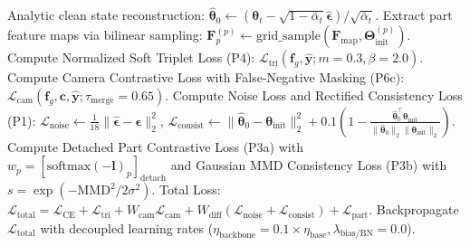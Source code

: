 \begin{algorithm}[ht]
\begin{algorithmic}[1]
        \State Analytic clean state reconstruction: $\hat{\boldsymbol{\theta}}_0 \leftarrow (\boldsymbol{\theta}_t - \sqrt{1 - \bar{\alpha}_t}\hat{\boldsymbol{\epsilon}}) / \sqrt{\bar{\alpha}_t}$.
        \State Extract part feature maps via bilinear sampling: $\mathbf{F}_p^{(p)} \leftarrow \text{grid\_sample}(\mathbf{F}_{\text{map}}, \mathbf{\Theta}_{\text{init}}^{(p)})$.
        \State Compute Normalized Soft Triplet Loss (P4): $\mathcal{L}_{\text{tri}}(\mathbf{f}_g, \hat{\mathbf{y}}; m=0.3, \beta=2.0)$.
        \State Compute Camera Contrastive Loss with False-Negative Masking (P6c): $\mathcal{L}_{\text{cam}}(\mathbf{f}_g, \mathbf{c}, \hat{\mathbf{y}}; \tau_{\text{merge}}=0.65)$.
        \State Compute Noise Loss and Rectified Consistency Loss (P1):
               $\mathcal{L}_{\text{noise}} \leftarrow \frac{1}{18}\|\hat{\boldsymbol{\epsilon}} - \boldsymbol{\epsilon}\|_2^2$, $\mathcal{L}_{\text{consist}} \leftarrow \|\hat{\boldsymbol{\theta}}_0 - \boldsymbol{\theta}_{\text{init}}\|_2^2 + 0.1\left(1 - \frac{\hat{\boldsymbol{\theta}}_0^\top \boldsymbol{\theta}_{\text{init}}}{\|\hat{\boldsymbol{\theta}}_0\|_2 \|\boldsymbol{\theta}_{\text{init}}\|_2}\right)$.
        \State Compute Detached Part Contrastive Loss (P3a) with $w_p = [\text{softmax}(-\mathbf{l})_p]_{\text{detach}}$ and Gaussian MMD Consistency Loss (P3b) with $s = \exp(-\text{MMD}^2 / 2\sigma^2)$.
        \State Total Loss: $\mathcal{L}_{\text{total}} = \mathcal{L}_{\text{CE}} + \mathcal{L}_{\text{tri}} + W_{\text{cam}}\mathcal{L}_{\text{cam}} + W_{\text{diff}}(\mathcal{L}_{\text{noise}} + \mathcal{L}_{\text{consist}}) + \mathcal{L}_{\text{part}}$.
        \State Backpropagate $\mathcal{L}_{\text{total}}$ with decoupled learning rates ($\eta_{\text{backbone}} = 0.1\times\eta_{\text{base}}, \lambda_{\text{bias/BN}}=0.0$).
    \EndFor
\EndFor
\end{algorithmic}
\end{algorithm}

